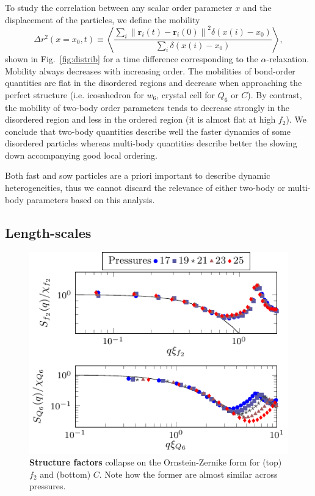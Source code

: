 \documentclass[twocolumn,superscriptaddress]{revtex4-1}
\begin{document}
To study the correlation between any scalar order parameter $x$ and the displacement of the particles, we define the mobility 
\begin{equation}
	\Delta r^2(x=x_0, t) \equiv \left\langle \frac{
		\sum\limits_i{
			\left\|\mathbf{r}_i(t)-\mathbf{r}_i(0)\right\|^2 \delta(x(i)-x_0)
			}
	}{
		\sum\limits_i{\delta(x(i)-x_0)}
	}\right\rangle,
	\label{eq:mobility}
\end{equation}
shown in Fig.~\ref{fig:distrib} for a time difference corresponding to the $\alpha$-relaxation. Mobility always decreases with increasing order. The mobilities of bond-order quantities are flat in the disordered regions and decrease when approaching the perfect structure (i.e. icosahedron for $w_6$, crystal cell for $Q_6$ or $C$). By contrast, the mobility of two-body order parameters tends to decrease strongly in the disordered region and less in the ordered region (it is almost flat at high $f_2$). We conclude that two-body quantities describe well the faster dynamics of some disordered particles whereas multi-body quantities describe better the slowing down accompanying good local ordering.

Both fast and sow particles are a priori important to describe dynamic heterogeneities, thus we cannot discard the relevance of either two-body or multi-body parameters based on this analysis.

\subsection{Length-scales}
\begin{figure}
	\centering
	\includegraphics{fig_structurefactor}
	\caption{\textbf{Structure factors} collapse on the Ornstein-Zernike form for (top) $f_2$ and (bottom) $C$. Note how the former are almost similar across pressures.}
	\label{fig:structurefactor}
\end{figure}
\end{document}
